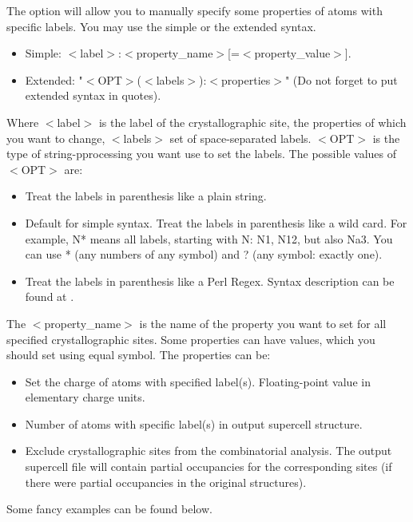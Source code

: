 \documentclass[a4paper,english]{article}
\begin{document}
\begin{Description}
\item[\OptArg{-p }{labels-properties}, \OptArg{\Dd property=}{labels-properties}]
      The option will allow you to manually specify some properties of atoms with specific labels. You may use the simple or the extended syntax.
       \begin{itemize}
         \item Simple: $<$label$>$:$<$property\_name$>$[=$<$property\_value$>$].
         \item Extended: "$<$OPT$>$($<$labels$>$):{$<$properties$>$}" (Do not forget to put extended syntax in quotes).
       \end{itemize}
       Where $<$label$>$ is the label of the crystallographic site, the properties of which you want to change, $<$labels$>$ set of space-separated labels. $<$OPT$>$ is the type of string-pprocessing you want use to set the labels. The possible values of $<$OPT$>$ are:
       \begin{itemize}
         \item[p] Treat the labels in parenthesis like a plain string. 
         \item[w, ""] Default for simple syntax. Treat the labels in parenthesis like a wild card. For example, N* means all labels, starting with N: N1, N12, but also Na3. You can use * (any numbers of any symbol) and ? (any symbol: exactly one).
         \item[r] Treat the labels in parenthesis like a Perl Regex. Syntax description can be found at .
       \end{itemize}
       The $<$property\_name$>$ is the name of the property you want to set for all specified crystallographic sites. Some properties can have values, which you should set using equal symbol. The properties can be:
       \begin{itemize}
         \item[c\Lbr harge\Rbr] Set the charge of atoms with specified label(s). Floating-point value in elementary charge units.
         \item[p\Lbr opulation\Rbr] Number of atoms with specific label(s) in output supercell structure.
         \item[\Lbr not\Rbr fixed] Exclude crystallographic sites from the combinatorial analysis. The output supercell file will contain partial occupancies for the corresponding sites (if there were partial occupancies in the original structures).
       \end{itemize}
       Some fancy examples can be found below.      
      

\end{Description}
\end{document}

